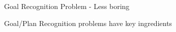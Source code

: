 \documentclass[usenames,dvipsnames]{beamer}
\begin{document}
\begin{frame}[c]{Goal Recognition Problem - Less boring}
\begin{block}{Goal/Plan Recognition problems have  key ingredients}
\begin{columns}[t]
\begin{column}{.24\textwidth}
\begin{center}
			\end{center}
		\end{column}
	\end{columns}
	\begin{columns}
		\begin{column}{.75\textwidth}
			\begin{center}
			\end{center}
		\end{column}
		\begin{column}{.3\textwidth}
			\begin{center}

\end{center}
\end{column}
\end{columns}
\end{block}
\end{frame}
\end{document}
